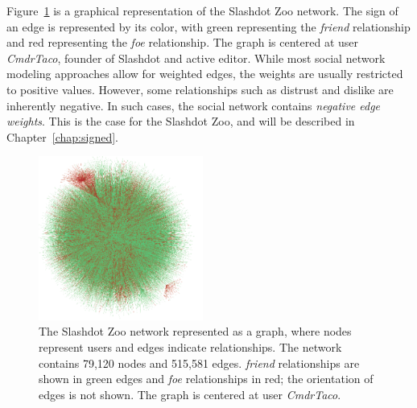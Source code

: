 \documentclass[11pt,a4paper]{book}
\newcommand{\wTwo}{0.48}
\begin{document}
Figure~\ref{fig:layout} is a graphical representation of the Slashdot
Zoo network.  The sign of an edge is represented by its color, with green
representing the \emph{friend} relationship and red representing the
\emph{foe} relationship.  The graph is centered at user \emph{CmdrTaco}, founder
of Slashdot and active editor. 
While most social network modeling approaches allow for weighted edges,
the weights are usually restricted to positive values.  However, some
relationships such as distrust and dislike are inherently negative.  In
such cases, the social network contains \emph{negative edge weights}.
This is the case for the Slashdot Zoo, and will be described in
Chapter~\ref{chap:signed}. 

\begin{figure}
  \centering
  \includegraphics[width=\wTwo\textwidth]{img-eps/out2_gross__PERFECT_klein}
  \caption{
    The Slashdot Zoo network represented as a graph, where nodes
    represent users and edges indicate relationships.  The network
    contains 79,120 nodes and 515,581 edges.  \emph{friend} relationships
    are shown in green edges and \emph{foe} relationships in red; the
    orientation of edges is not shown.  The graph is centered at user
    \emph{CmdrTaco}. 
  }
  \label{fig:layout}
\end{figure}
\end{document}
